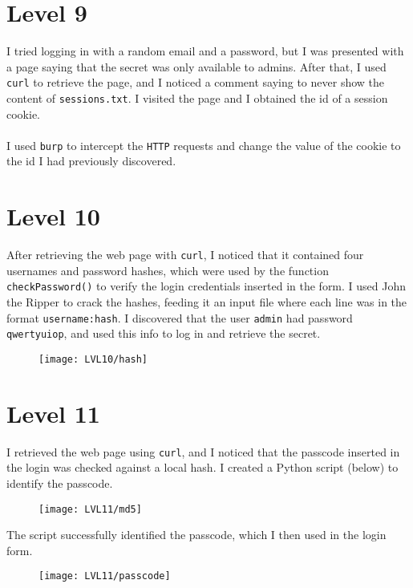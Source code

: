 \documentclass[12pt,a4paper]{article}
\begin{document}
	\section*{Level 9}
	I tried logging in with a random email and a password, but I was presented with a page saying that the secret was only available to admins. After that, I used \texttt{curl} to retrieve the page, and I noticed a comment saying to never show the content of \texttt{sessions.txt}. I visited the page and I obtained the id of a session cookie.\\\\
	I used \texttt{burp} to intercept the \texttt{HTTP} requests and change the value of the cookie to the id I had previously discovered.
	
	\section*{Level 10}
After retrieving the web page with \texttt{curl}, I noticed that it contained four usernames and password hashes, which were used by the function \texttt{checkPassword()} to verify the login credentials inserted in the form. I used John the Ripper to crack the hashes, feeding it an input file where each line was in the format \texttt{username:hash}. I discovered that the user \texttt{admin} had password \texttt{qwertyuiop}, and used this info to log in and retrieve the secret.
	\begin{figure}[H]
		\centering
		\texttt{[image: LVL10/hash]}
		\label{fig:john}
	\end{figure}

	\section*{Level 11}
	I retrieved the web page using \texttt{curl}, and I noticed that the passcode inserted in the login was checked against a local hash. I created a Python script (below) to identify the passcode.
	\begin{figure}[H]
		\centering
		\texttt{[image: LVL11/md5]}
		\label{fig:md5}
	\end{figure}
	The script successfully identified the passcode, which I then used in the login form.
	\begin{figure}[H]
		\centering
		\texttt{[image: LVL11/passcode]}
		\label{fig:foundhash}
	\end{figure}
\end{document}
